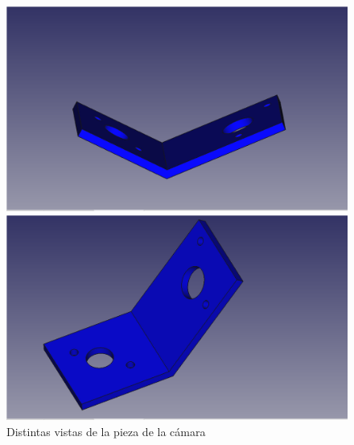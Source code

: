 \begin{figure}[ht!]
	\centering
	\begin{minipage}{0.45\linewidth}
		\centering
		\includegraphics[width=\linewidth]{figs/cap5/camera2sin.png}
		\caption*{\centering}
	\end{minipage}
	\hspace{1cm}
	\begin{minipage}{0.45\linewidth}
		\centering
		\includegraphics[width=\linewidth]{figs/cap5/camera3sin.png}
		\caption*{\centering}
	\end{minipage}
	
	\caption{Distintas vistas de la pieza de la cámara}
	\label{fig:pcamara}
\end{figure}


